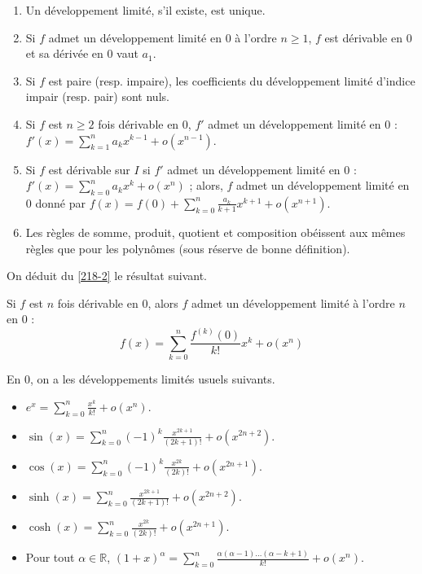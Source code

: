   \begin{proposition}
    \begin{enumerate}[label={\bfseries(\roman*)}]
      \item Un développement limité, s'il existe, est unique.
      \item Si $f$ admet un développement limité en $0$ à l'ordre $n \geq 1$, $f$ est dérivable en $0$ et sa dérivée en $0$ vaut $a_1$.
      \item Si $f$ est paire (resp. impaire), les coefficients du développement limité d'indice impair (resp. pair) sont nuls.
      \item Si $f$ est $n \geq 2$ fois dérivable en $0$, $f'$ admet un développement limité en $0$ : $f'(x) = \sum_{k=1}^{n} a_k x^{k-1} + o(x^{n-1})$.
      \item Si $f$ est dérivable sur $I$ si $f'$ admet un développement limité en $0$ : $f'(x) = \sum_{k=0}^{n} a_k x^k + o(x^n)$ ; alors, $f$ admet un développement limité en $0$ donné par $f(x) = f(0) + \sum_{k=0}^{n} \frac{a_k}{k+1} x^{k+1} + o(x^{n+1})$.
      \item Les règles de somme, produit, quotient et composition obéissent aux mêmes règles que pour les polynômes (sous réserve de bonne définition).
    \end{enumerate}
  \end{proposition}

  On déduit du \cref{218-2} le résultat suivant.

  \begin{proposition}
    Si $f$ est $n$ fois dérivable en $0$, alors $f$ admet un développement limité à l'ordre $n$ en $0$ :
    \[ f(x) = \sum_{k=0}^{n} \frac{f^{(k)} (0)}{k!} x^k + o(x^n) \]
  \end{proposition}

  \begin{example}
    En $0$, on a les développements limités usuels suivants.
    \begin{itemize}
      \item $e^x = \sum_{k=0}^{n} \frac{x^k}{k!} + o(x^n)$.
      \item $\sin(x) = \sum_{k=0}^{n} (-1)^{k} \frac{x^{2k+1}}{(2k+1)!} + o(x^{2n+2})$.
      \item $\cos(x) = \sum_{k=0}^{n} (-1)^{k} \frac{x^{2k}}{(2k)!} + o(x^{2n+1})$.
      \item $\sinh(x) = \sum_{k=0}^{n} \frac{x^{2k+1}}{(2k+1)!} + o(x^{2n+2})$.
      \item $\cosh(x) = \sum_{k=0}^{n} \frac{x^{2k}}{(2k)!} + o(x^{2n+1})$.
      \item Pour tout $\alpha \in \mathbb{R}$, $(1+x)^\alpha = \sum_{k=0}^n \frac{\alpha(\alpha - 1) \dots (\alpha -k+1)}{k!} + o(x^n)$.
    \end{itemize}
  \end{example}

